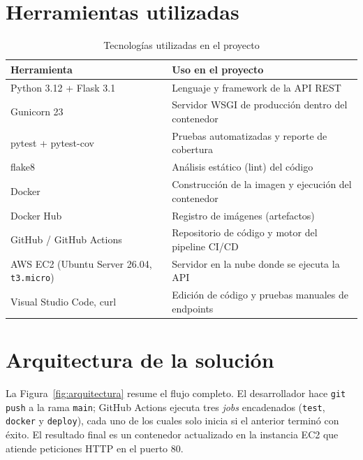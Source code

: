 \documentclass[12pt,letterpaper]{article}
\begin{document}
\section{Herramientas utilizadas}

\begin{table}[H]
\centering
\caption{Tecnologías utilizadas en el proyecto}
\label{tab:herramientas}
\begin{tabularx}{\textwidth}{@{}lX@{}}
\toprule
\textbf{Herramienta} & \textbf{Uso en el proyecto} \\
\midrule
Python 3.12 + Flask 3.1 & Lenguaje y framework de la API REST \\
Gunicorn 23 & Servidor WSGI de producción dentro del contenedor \\
pytest + pytest-cov & Pruebas automatizadas y reporte de cobertura \\
flake8 & Análisis estático (lint) del código \\
Docker & Construcción de la imagen y ejecución del contenedor \\
Docker Hub & Registro de imágenes (artefactos) \\
GitHub / GitHub Actions & Repositorio de código y motor del pipeline CI/CD \\
AWS EC2 (Ubuntu Server 26.04, \texttt{t3.micro}) & Servidor en la nube donde se ejecuta la API \\
Visual Studio Code, curl & Edición de código y pruebas manuales de endpoints \\
\bottomrule
\end{tabularx}
\end{table}

\section{Arquitectura de la solución}

La Figura~\ref{fig:arquitectura} resume el flujo completo. El desarrollador hace \texttt{git push}
a la rama \texttt{main}; GitHub Actions ejecuta tres \textit{jobs} encadenados (\texttt{test},
\texttt{docker} y \texttt{deploy}), cada uno de los cuales solo inicia si el anterior terminó con
éxito. El resultado final es un contenedor actualizado en la instancia EC2 que atiende peticiones
HTTP en el puerto 80.
\end{document}
